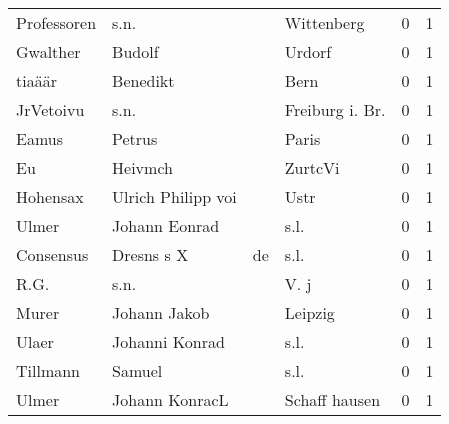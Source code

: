 \begin{tabular}{llllrr}
              Professoren &                               s.n. &             &                                  Wittenberg &          0 &         1 \\
                 Gwalther &                             Budolf &             &                                      Urdorf &          0 &         1 \\
                   tiaäär &                           Benedikt &             &                                        Bern &          0 &         1 \\
                JrVetoivu &                               s.n. &             &                            Freiburg i. Br.  &          0 &         1 \\
                    Eamus &                             Petrus &             &                                       Paris &          0 &         1 \\
                       Eu &                            Heivmch &             &                                     ZurtcVi &          0 &         1 \\
                 Hohensax &                 Ulrich Philipp voi &             &                                        Ustr &          0 &         1 \\
                    Ulmer &                      Johann Eonrad &             &                                        s.l. &          0 &         1 \\
                Consensus &                         Dresns s X &          de &                                        s.l. &          0 &         1 \\
                     R.G. &                               s.n. &             &                                        V. j &          0 &         1 \\
                    Murer &                       Johann Jakob &             &                                     Leipzig &          0 &         1 \\
                    Ulaer &                     Johanni Konrad &             &                                        s.l. &          0 &         1 \\
                 Tillmann &                             Samuel &             &                                        s.l. &          0 &         1 \\
                    Ulmer &                     Johann KonracL &             &                               Schaff hausen &          0 &         1 \\

\end{tabular}
